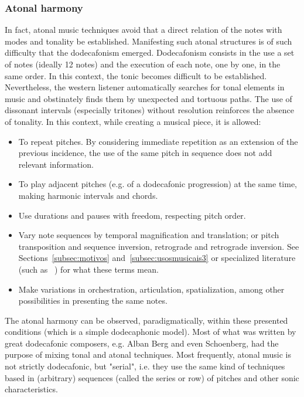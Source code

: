 \subsubsection{Atonal harmony}\label{sec:atonal}
In fact, atonal music techniques avoid that a direct relation of the notes with modes and tonality be established. Manifesting such atonal structures is of such difficulty that the dodecafonism emerged. Dodecafonism consists in the use a set of notes (ideally 12 notes) and the execution of each note, one by one, in the same
order. In this context, the tonic becomes difficult to be established. Nevertheless, the western listener automatically searches for tonal elements in music and obstinately finds them by unexpected and tortuous paths. The use of dissonant intervals (especially tritones) without resolution reinforces the absence of tonality. In this context, while creating a musical
piece, it is allowed:
\begin{itemize}
     \item To repeat pitches. By considering immediate repetition as an extension of the previous incidence, the use of the same pitch in sequence does not add relevant information.
     \item To play adjacent pitches (e.g. of a dodecafonic progression) at the same time, making harmonic intervals and chords.
     \item Use durations and pauses with freedom, respecting pitch order.
     \item Vary note sequences by temporal magnification and translation; or pitch transposition and sequence inversion, retrograde and retrograde inversion. See Sections~\ref{subsec:motivos} and~\ref{subsec:usosmusicais3} or specialized literature (such as ~\cite{serial}) for what these terms mean.
     \item Make variations in orchestration, articulation, spatialization, among other possibilities in presenting the same notes.
\end{itemize}

The atonal harmony can be observed, paradigmatically, within these presented conditions (which is a simple dodecaphonic model). Most of what was written by great dodecafonic composers,
e.g. Alban Berg and even Schoenberg, had the purpose of mixing tonal and atonal techniques.
Most frequently, atonal music is not strictly dodecafonic, but "serial",
i.e. they use the same kind of techniques based in (arbitrary) sequences (called the series or row)
of pitches and other sonic characteristics.


